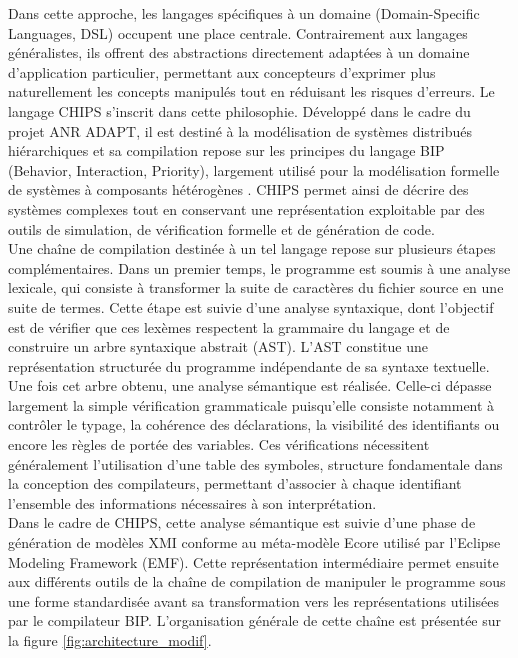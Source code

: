 Dans cette approche, les langages spécifiques à un domaine (Domain-Specific Languages, DSL) occupent une place centrale. Contrairement aux langages généralistes, ils offrent des abstractions directement adaptées à un domaine d'application particulier, permettant aux concepteurs d'exprimer plus naturellement les concepts manipulés tout en réduisant les risques d'erreurs. Le langage CHIPS s'inscrit dans cette philosophie. Développé dans le cadre du projet ANR ADAPT, il est destiné à la modélisation de systèmes distribués hiérarchiques et sa compilation repose sur les principes du langage BIP (Behavior, Interaction, Priority), largement utilisé pour la modélisation formelle de systèmes à composants hétérogènes \cite{basu2011bip}. CHIPS permet ainsi de décrire des systèmes complexes tout en conservant une représentation exploitable par des outils de simulation, de vérification formelle et de génération de code. \\

Une chaîne de compilation destinée à un tel langage repose sur plusieurs étapes complémentaires. Dans un premier temps, le programme est soumis à une analyse lexicale, qui consiste à transformer la suite de caractères du fichier source en une suite de termes. Cette étape est suivie d'une analyse syntaxique, dont l'objectif est de vérifier que ces lexèmes respectent la grammaire du langage et de construire un arbre syntaxique abstrait (AST). L'AST constitue une représentation structurée du programme indépendante de sa syntaxe textuelle. \\

Une fois cet arbre obtenu, une analyse sémantique est réalisée. Celle-ci dépasse largement la simple vérification grammaticale puisqu'elle consiste notamment à contrôler le typage, la cohérence des déclarations, la visibilité des identifiants ou encore les règles de portée des variables. Ces vérifications nécessitent généralement l'utilisation d'une table des symboles, structure fondamentale dans la conception des compilateurs, permettant d'associer à chaque identifiant l'ensemble des informations nécessaires à son interprétation. \\

Dans le cadre de CHIPS, cette analyse sémantique est suivie d'une phase de génération de modèles XMI conforme au méta-modèle Ecore utilisé par l'Eclipse Modeling Framework (EMF). Cette représentation intermédiaire permet ensuite aux différents outils de la chaîne de compilation de manipuler le programme sous une forme standardisée avant sa transformation vers les représentations utilisées par le compilateur BIP. L'organisation générale de cette chaîne est présentée sur la figure \ref{fig:architecture_modif}. \\

